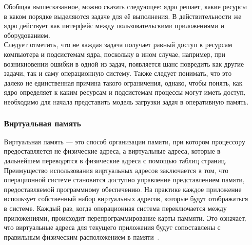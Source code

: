 \indent Обобщая вышесказанное, можно сказать следующее:
ядро решает, какие ресурсы в каком порядке выделяются задаче для её выполнения.
В действительности же ядро действует как интерфейс между пользовательскими приложениями и оборудованием.\\
\indent Следует отметить, что не каждая задача получает равный доступ к ресурсам компьютера и подсистемам ядра,
поскольку в ином случае, например, при возникновении ошибки в одной из задач,
появляется шанс повредить как другие задачи, так и саму операционную систему.
Также следует понимать, что это далеко не единственная причина такого ограничения, однако,
чтобы понять, как ядро определяет к каким ресурсам и подсистемам процессы могут иметь доступ,
необходимо для начала представить модель загрузки задач в оперативную память.

\subsubsection{Виртуальная память}\label{subsec:-}

Виртуальная память --- это способ организации памяти, при котором процессору предоставляется не физические адреса, а виртуальные адреса, которые в дальнейшем переводятся в физические адреса с помощью таблиц страниц.
\\
Преимущество использования виртуальных адресов заключается в том,
что операционной системе становится доступно управление представлением памяти,
предоставляемой программному обеспечению.
На практике каждое приложение использует собственный набор виртуальных адресов,
которые будут отображаться в системе.
Каждый раз, когда операционная система переключается между приложениями, происходит перепрограммирование карты паммяти.
Это означает, что виртуальные адреса для текущего приложения будут сопоставлены с правильным физическим расположением в памяти~\cite{arm-virt}.\\

